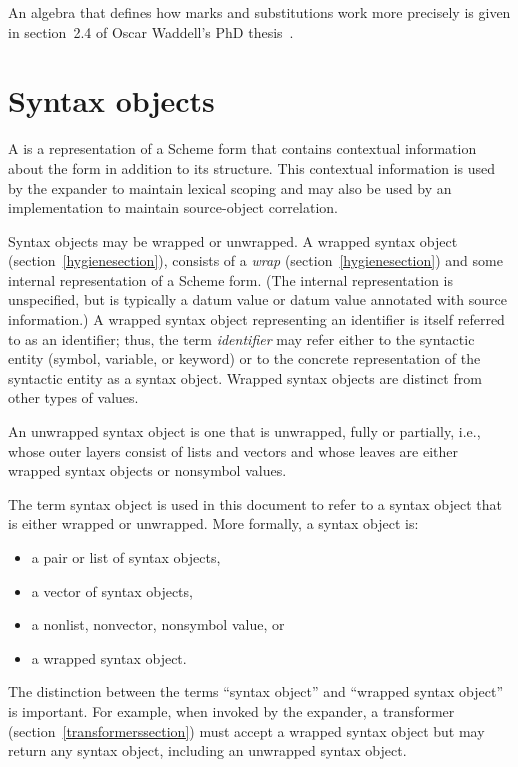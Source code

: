 An algebra that defines how marks and substitutions work more precisely is
given in section~2.4 of Oscar Waddell's PhD thesis~\cite{Waddellphd}.

\section{Syntax objects}
\label{syntaxobjectssection}

A  is a representation of a Scheme form that contains
contextual information about the form in addition to its structure.
This contextual information is used by the expander to maintain
lexical scoping and may also be used by an implementation to maintain
source-object correlation.

Syntax objects may be wrapped or unwrapped.
A wrapped syntax object (section~\ref{hygienesection}), consists of a
\textit{wrap} (section~\ref{hygienesection}) and some internal representation
of a Scheme form.
(The internal representation is unspecified, but is typically a 
datum value or datum value annotated with source information.)
A wrapped syntax object representing an identifier is itself referred to as
an identifier; thus, the term \textit{identifier} may refer either to
the syntactic entity (symbol, variable, or keyword) or to the
concrete representation of the syntactic entity as a syntax object.
Wrapped syntax objects are distinct from other types of values.

An unwrapped syntax object is one that is unwrapped, fully or partially,
i.e., whose outer layers consist of lists and vectors and whose leaves are
either wrapped syntax objects or nonsymbol values.

The term syntax object is used in this document to refer to
a syntax object that is either wrapped or unwrapped.
More formally, a syntax object is:

\begin{itemize}
\item a pair or list of syntax objects,
\item a vector of syntax objects,
\item a nonlist, nonvector, nonsymbol value, or
\item a wrapped syntax object.
\end{itemize}

The distinction between the terms ``syntax object'' and ``wrapped syntax
object'' is important.
For example, when invoked by the expander, a transformer
(section~\ref{transformerssection}) must accept a wrapped syntax object but
may return any syntax object, including an unwrapped syntax object.


